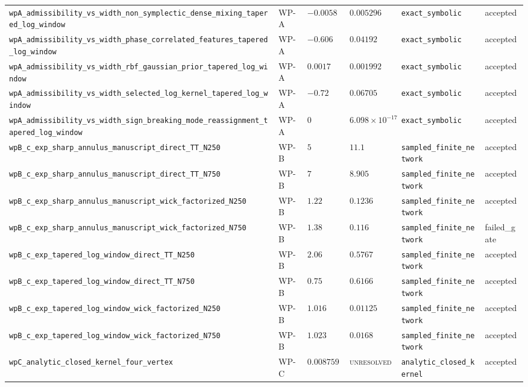 \begin{table}[t]
\begin{tabular}{@{}llllll@{}}
\texttt{wpA\_admissibility\_vs\_width\_non\_symplectic\_dense\_mixing\_tapered\_log\_window} & WP-A & $-0.0058$ & $0.005296$ & \texttt{exact\_symbolic} & accepted \\
\texttt{wpA\_admissibility\_vs\_width\_phase\_correlated\_features\_tapered\_log\_window} & WP-A & $-0.606$ & $0.04192$ & \texttt{exact\_symbolic} & accepted \\
\texttt{wpA\_admissibility\_vs\_width\_rbf\_gaussian\_prior\_tapered\_log\_window} & WP-A & $0.0017$ & $0.001992$ & \texttt{exact\_symbolic} & accepted \\
\texttt{wpA\_admissibility\_vs\_width\_selected\_log\_kernel\_tapered\_log\_window} & WP-A & $-0.72$ & $0.06705$ & \texttt{exact\_symbolic} & accepted \\
\texttt{wpA\_admissibility\_vs\_width\_sign\_breaking\_mode\_reassignment\_tapered\_log\_window} & WP-A & $0$ & $6.098\times10^{-17}$ & \texttt{exact\_symbolic} & accepted \\
\texttt{wpB\_c\_exp\_sharp\_annulus\_manuscript\_direct\_TT\_N250} & WP-B & $5$ & $11.1$ & \texttt{sampled\_finite\_network} & accepted \\
\texttt{wpB\_c\_exp\_sharp\_annulus\_manuscript\_direct\_TT\_N750} & WP-B & $7$ & $8.905$ & \texttt{sampled\_finite\_network} & accepted \\
\texttt{wpB\_c\_exp\_sharp\_annulus\_manuscript\_wick\_factorized\_N250} & WP-B & $1.22$ & $0.1236$ & \texttt{sampled\_finite\_network} & accepted \\
\texttt{wpB\_c\_exp\_sharp\_annulus\_manuscript\_wick\_factorized\_N750} & WP-B & $1.38$ & $0.116$ & \texttt{sampled\_finite\_network} & failed\_gate \\
\texttt{wpB\_c\_exp\_tapered\_log\_window\_direct\_TT\_N250} & WP-B & $2.06$ & $0.5767$ & \texttt{sampled\_finite\_network} & accepted \\
\texttt{wpB\_c\_exp\_tapered\_log\_window\_direct\_TT\_N750} & WP-B & $0.75$ & $0.6166$ & \texttt{sampled\_finite\_network} & accepted \\
\texttt{wpB\_c\_exp\_tapered\_log\_window\_wick\_factorized\_N250} & WP-B & $1.016$ & $0.01125$ & \texttt{sampled\_finite\_network} & accepted \\
\texttt{wpB\_c\_exp\_tapered\_log\_window\_wick\_factorized\_N750} & WP-B & $1.023$ & $0.0168$ & \texttt{sampled\_finite\_network} & accepted \\
\texttt{wpC\_analytic\_closed\_kernel\_four\_vertex} & WP-C & $0.00875916$ & \textsc{unresolved} & \texttt{analytic\_closed\_kernel} & accepted \\

\end{tabular}
\end{table}
